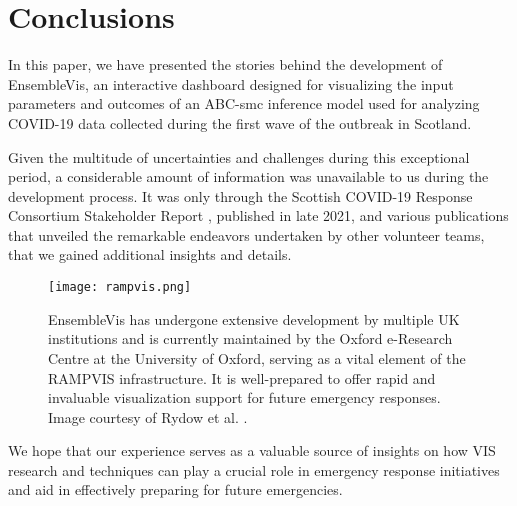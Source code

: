 \section{Conclusions}

In this paper, we have presented the stories behind the development of EnsembleVis, an interactive dashboard designed for visualizing the input parameters and outcomes of an ABC-smc inference model used for analyzing COVID-19 data collected during the first wave of the outbreak in Scotland.

Given the multitude of uncertainties and challenges during this exceptional period, a considerable amount of information was unavailable to us during the development process. It was only through the Scottish COVID-19 Response Consortium Stakeholder Report \cite{abdalla2021Scottish}, published in late 2021, and various publications \cite{chen2022RAMPVIS,dykes2022Visualizationb,khan2022Propagating,rydow2023RAMPVIS} that unveiled the remarkable endeavors undertaken by other volunteer teams, that we gained additional insights and details.

\begin{figure}[tb!]
    \centering
    \texttt{[image: rampvis.png]}
    \caption{EnsembleVis has undergone extensive development by multiple UK institutions and is currently maintained by the Oxford e-Research Centre at the University of Oxford, serving as a vital element of the RAMPVIS infrastructure. It is well-prepared to offer rapid and invaluable visualization support for future emergency responses. Image courtesy of Rydow et al. \cite{rydow2023RAMPVIS}.
    }
    \label{fig:rampvis}

\end{figure}

We hope that our experience serves as a valuable source of insights on how VIS research and techniques can play a crucial role in emergency response initiatives and aid in effectively preparing for future emergencies.